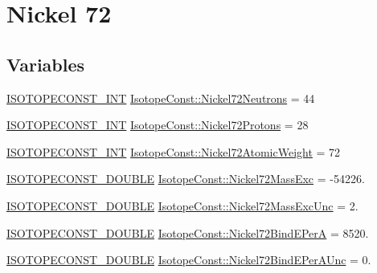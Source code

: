 \hypertarget{group___isotope_const-_nickel-_ni72}{}\section{Nickel 72}
\label{group___isotope_const-_nickel-_ni72}
\subsection*{Variables}
\begin{DoxyCompactItemize}
\item 
\mbox{\hyperlink{group___isotope_const-_macros_ga5f18360b3e99483a35c32d789e62621c}{I\+S\+O\+T\+O\+P\+E\+C\+O\+N\+S\+T\+\_\+\+I\+NT}} \mbox{\hyperlink{group___isotope_const-_nickel-_ni72_ga3aeccb72b0e4944f36a6cef82fbfe2eb}{Isotope\+Const\+::\+Nickel72\+Neutrons}} = 44
\item 
\mbox{\hyperlink{group___isotope_const-_macros_ga5f18360b3e99483a35c32d789e62621c}{I\+S\+O\+T\+O\+P\+E\+C\+O\+N\+S\+T\+\_\+\+I\+NT}} \mbox{\hyperlink{group___isotope_const-_nickel-_ni72_ga8729da10b7b48af2ddba9bb72472b054}{Isotope\+Const\+::\+Nickel72\+Protons}} = 28
\item 
\mbox{\hyperlink{group___isotope_const-_macros_ga5f18360b3e99483a35c32d789e62621c}{I\+S\+O\+T\+O\+P\+E\+C\+O\+N\+S\+T\+\_\+\+I\+NT}} \mbox{\hyperlink{group___isotope_const-_nickel-_ni72_ga0cd8171bdd866b11f368395ad9c3042b}{Isotope\+Const\+::\+Nickel72\+Atomic\+Weight}} = 72
\item 
\mbox{\hyperlink{group___isotope_const-_macros_ga8f45a7272ce02c0b4c65c44636ed719a}{I\+S\+O\+T\+O\+P\+E\+C\+O\+N\+S\+T\+\_\+\+D\+O\+U\+B\+LE}} \mbox{\hyperlink{group___isotope_const-_nickel-_ni72_gac3be214ae8f015545fbbbac18348f9ba}{Isotope\+Const\+::\+Nickel72\+Mass\+Exc}} = -\/54226.
\item 
\mbox{\hyperlink{group___isotope_const-_macros_ga8f45a7272ce02c0b4c65c44636ed719a}{I\+S\+O\+T\+O\+P\+E\+C\+O\+N\+S\+T\+\_\+\+D\+O\+U\+B\+LE}} \mbox{\hyperlink{group___isotope_const-_nickel-_ni72_gaac79ebd188f5212e6a890c0a446de821}{Isotope\+Const\+::\+Nickel72\+Mass\+Exc\+Unc}} = 2.
\item 
\mbox{\hyperlink{group___isotope_const-_macros_ga8f45a7272ce02c0b4c65c44636ed719a}{I\+S\+O\+T\+O\+P\+E\+C\+O\+N\+S\+T\+\_\+\+D\+O\+U\+B\+LE}} \mbox{\hyperlink{group___isotope_const-_nickel-_ni72_gaace6c2704943af0cb514a38183b07f55}{Isotope\+Const\+::\+Nickel72\+Bind\+E\+PerA}} = 8520.
\item 
\mbox{\hyperlink{group___isotope_const-_macros_ga8f45a7272ce02c0b4c65c44636ed719a}{I\+S\+O\+T\+O\+P\+E\+C\+O\+N\+S\+T\+\_\+\+D\+O\+U\+B\+LE}} \mbox{\hyperlink{group___isotope_const-_nickel-_ni72_ga55277d080c2e966e1c954a98836eaeb2}{Isotope\+Const\+::\+Nickel72\+Bind\+E\+Per\+A\+Unc}} = 0.

\end{DoxyCompactItemize}
